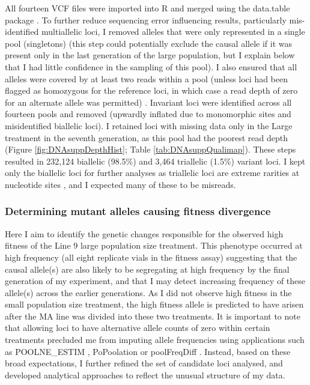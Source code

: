 All fourteen VCF files were imported into R and merged using the data.table package \citep{Dowl20}. To further reduce sequencing error influencing results, particularly mis-identified multiallelic loci, I removed alleles that were only represented in a single pool (singletons) (this step could potentially exclude the causal allele if it was present only in the last generation of the large population, but I explain below that I had little confidence in the sampling of this pool). I also ensured that all alleles were covered by at least two reads within a pool (unless loci had been flagged as homozygous for the reference loci, in which case a read depth of zero for an alternate allele was permitted) \citep{Kofl11}. Invariant loci were identified across all fourteen pools and removed (upwardly inflated due to monomorphic sites and misidentified biallelic loci). I retained loci with missing data only in the Large treatment in the seventh generation, as this pool had the poorest read depth (Figure \ref{fig:DNAsuppDepthHist}; Table \ref{tab:DNAsuppQualimap}). These steps resulted in 232,124 biallelic (98.5\%) and 3,464 triallelic (1.5\%) variant loci. I kept only the biallelic loci for further analyses as triallelic loci are extreme rarities at nucleotide sites \citep{Burk10,Lync14}, and I expected many of these to be misreads.\par

\subsubsection{Determining mutant alleles causing fitness divergence}
Here I aim to identify the genetic changes responsible for the observed high fitness of the Line 9 large population size treatment. This phenotype occurred at high frequency (all eight replicate vials in the fitness assay) suggesting that the causal allele(s) are also likely to be segregating at high frequency by the final generation of my experiment, and that I may detect increasing frequency of these allele(s) across the earlier generations. As I did not observe high fitness in the small population size treatment, the high fitness allele is predicted to have arisen after the MA line was divided into these two treatments. It is important to note that allowing loci to have alternative allele counts of zero within certain treatments precluded me from imputing allele frequencies using applications such as POOLNE\_ESTIM \citep{Gaut13}, PoPoolation \citep{Kofl11} or poolFreqDiff \citep{Wibe17}. Instead, based on these broad expectations, I further refined the set of candidate loci analysed, and developed analytical approaches to reflect the unusual structure of my data. \par

